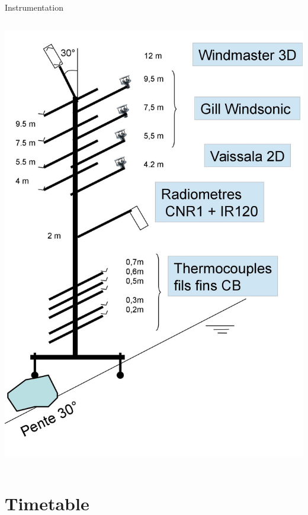 \documentclass{beamer}
\begin{document}
\begin{frame}{Instrumentation}
\begin{columns}
\includegraphics[width=1.1\textwidth]{0002.jpg}
\end{columns}

\end{frame}


\section{Timetable}
\end{document}

